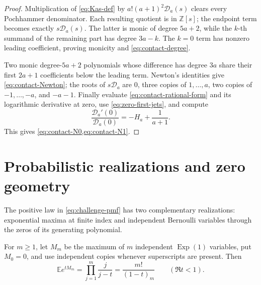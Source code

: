 \documentclass[11pt]{article}
\theoremstyle{definition}
\theoremstyle{remark}
\newcommand{\Z}{\mathbb Z}
\begin{document}
\begin{proof}
Multiplication of \eqref{eq:Kas-def} by
\(a!(a+1)^2\mathscr D_a(s)\) clears every Pochhammer denominator.  Each
resulting quotient is in \(\Z[s]\); the endpoint term becomes exactly
\(s\mathscr D_a(s)\).  The latter is monic of degree \(5a+2\), while the
\(k\)-th summand of the remaining part has degree \(3a-k\).  The \(k=0\)
term has nonzero leading coefficient, proving monicity and
\eqref{eq:contact-degree}.

Two monic degree-\(5a+2\) polynomials whose difference has degree \(3a\)
share their first \(2a+1\) coefficients below the leading term.  Newton's
identities give \eqref{eq:contact-Newton}; the roots of
\(s\mathscr D_a\) are \(0\), three copies of \(1,\ldots,a\), two copies of
\(-1,\ldots,-a\), and \(-a-1\).  Finally evaluate
\eqref{eq:contact-rational-form} and its logarithmic derivative at zero,
use \eqref{eq:zero-first-jets}, and compute
\[
 \frac{\mathscr D_a'(0)}{\mathscr D_a(0)}
 =-H_a+\frac1{a+1}.
\]
This gives \cref{eq:contact-N0,eq:contact-N1}.
\end{proof}

\section{Probabilistic realizations and zero geometry}
\label{sec:ram-probability}

The positive law in \eqref{eq:challenge-pmf} has two complementary
realizations: exponential maxima at finite index and independent Bernoulli
variables through the zeros of its generating polynomial.

For \(m\ge1\), let \(M_m\) be the maximum of \(m\) independent
\(\operatorname{Exp}(1)\) variables, put \(M_0=0\), and use independent
copies whenever superscripts are present.  Then
\begin{equation}\label{eq:maxima-mgf}
 \mathbb Ee^{tM_m}=\prod_{j=1}^m\frac j{j-t}
 =\frac{m!}{(1-t)_m}\qquad(\Re t<1).
\end{equation}
\end{document}

